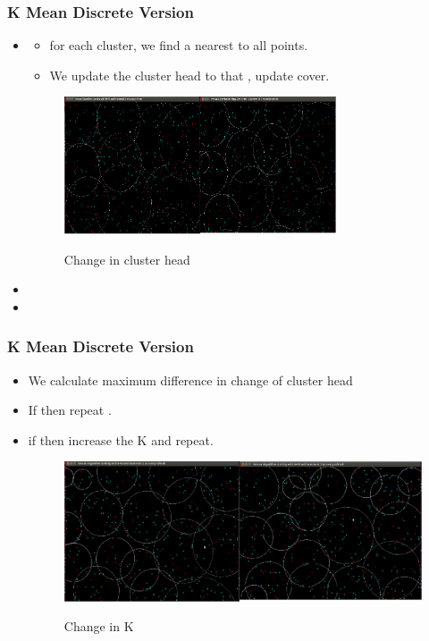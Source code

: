 \documentclass[blue]{beamer}
\begin{document}
\begin{frame}
\frametitle{ K Mean Discrete Version}
 \begin{itemize}
  \item {} 
   \begin{itemize}
    \item for each cluster, we find a {\color{blue}{blue point}} nearest to all points.
    \item We update the cluster head to that {\color{blue}{blue point}}, update cover.
   \end{itemize}
   \begin{figure}[H]
             \centering
           \scalebox{0.7}
          {\includegraphics[width=\linewidth,height=1.6in]{cover10.png}}
          \caption{Change in cluster head}
     \end{figure}
     \item {\color{blue}{Calculate the difference b/w old and new cluster head}}
     \item {\color{blue}{Calculate maximum radius.}} 
\end{itemize}
\end{frame}


\begin{frame}
\frametitle{K Mean Discrete Version}
 \begin{itemize}
  \item We calculate maximum difference in change of cluster head
  \item If {\color{red}{maximum difference $>$ tolerance}} then repeat {\color{blue}{the change in cluster}}.
  \item if {\color{red}{maximum radius  $>$ rad}} then increase the K and repeat.
  \begin{figure}[H]
     \caption{Change in K}
        \centering
           \scalebox{0.7}
          {\includegraphics[width=\linewidth]{cover11.png}}
     \end{figure}
   \end{itemize}
\end{frame}
\end{document}
